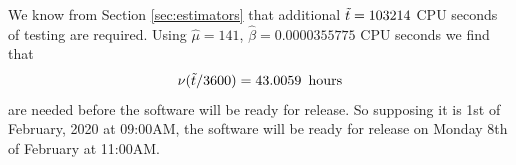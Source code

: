 We know from Section \ref{sec:estimators} that additional $\Tilde t = 103214$ CPU seconds of testing are required. Using $\hat\mu=141$, $\hat\beta=0.0000355775$ CPU seconds we find that
$$
\nu(\Tilde t/3600) = 43.0059\,\text{ hours}
$$
are needed before the software will be ready for release. So supposing it is 1st of February, 2020 at 09:00AM, the software will be ready for release on Monday 8th of February at 11:00AM.